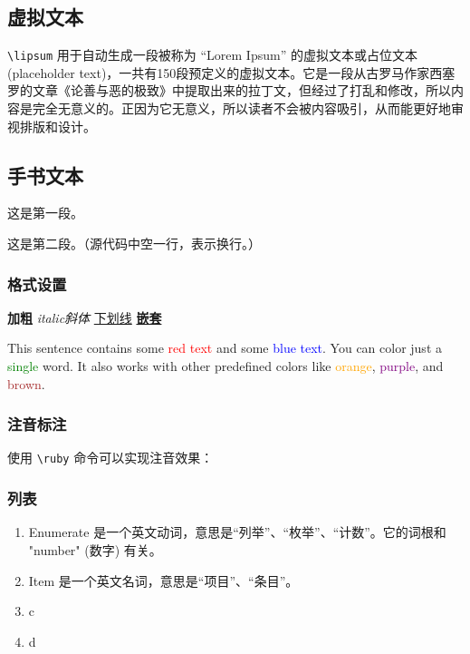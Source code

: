 \documentclass{ctexart}
\begin{document}
\subsection{虚拟文本}
\lstinline|\lipsum| 用于自动生成一段被称为 “Lorem Ipsum” 的虚拟文本或占位文本 (placeholder text)，一共有150段预定义的虚拟文本。它是一段从古罗马作家西塞罗的文章《论善与恶的极致》中提取出来的拉丁文，但经过了打乱和修改，所以内容是完全无意义的。正因为它无意义，所以读者不会被内容吸引，从而能更好地审视排版和设计。

\lipsum[1] %

\subsection{手书文本}
这是第一段。

这是第二段。（源代码中空一行，表示换行。）

\subsubsection{格式设置}
\textbf{加粗} \quad \textit{italic斜体} \quad \underline{下划线} \quad \underline{\textbf{嵌套}} %

This sentence contains some \textcolor{red}{red text} and some \textcolor{blue}{blue text}. You can color just a \textcolor{green}{single} word. It also works with other predefined colors like \textcolor{orange}{orange}, \textcolor{purple}{purple}, and \textcolor{brown}{brown}.

\subsubsection{注音标注}
使用 \lstinline|\ruby| 命令可以实现注音效果：

 \quad {}



\subsubsection{列表}
\begin{enumerate} %
    \item Enumerate 是一个英文动词，意思是“列举”、“枚举”、“计数”。它的词根和 "number" (数字) 有关。
    \item Item 是一个英文名词，意思是“项目”、“条目”。
    \item c
    \item d
\end{enumerate}
\end{document}
